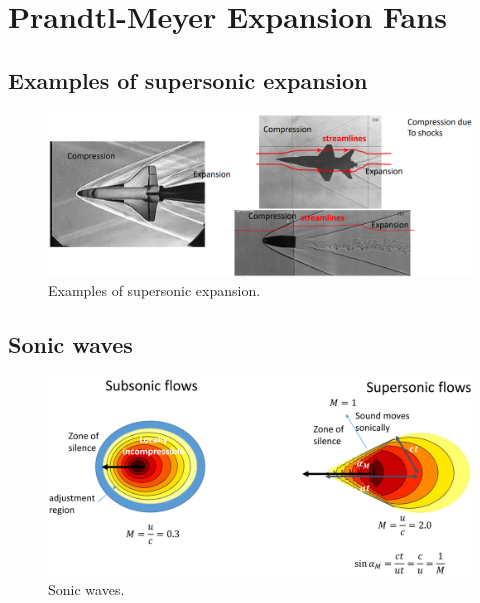 \documentclass[class=report, crop=false, 12pt,a4paper]{standalone}
\begin{document}
\section{Prandtl-Meyer Expansion Fans}
\subsection{Examples of supersonic expansion}
\begin{figure}[H]
    \centering
    \includegraphics[width = \textwidth]{../img/diagram18.png}
    \caption{Examples of supersonic expansion.}
\end{figure}
\subsection{Sonic waves}
\begin{figure}[H]
    \centering
    \includegraphics[width = \textwidth]{../img/diagram19.png}
    \caption{Sonic waves.}
\end{figure}
\end{document}
